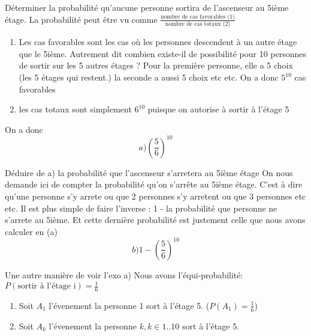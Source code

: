 	\begin{exo}
		\begin{subexo} {Déterminer la probabilité qu’aucune personne sortira de l’ascenseur au 5ième étage.}
			La probabilité peut être vu comme $\frac{\text{nombre de cas favorables (1)}}{\text{nombre de cas totaux (2)}}$
			
				\begin{enumerate}[label=(\arabic*)]
					\item Les cas favorables sont les cas où les personnes descendent à un autre étage que le 5ième.
					Autrement dit combien existe-il de possibilité pour 10 personnes de sortir sur les 5 autres étages ?
					Pour la première personne, elle a 5 choix (les 5 étages qui restent.) la seconde a aussi 5 choix etc etc.
					On a donc $5^{10}$ cas favorables
					\item les cas totaux sont simplement $6^{10}$ puisque on autorise à sortir à l'étage 5
				\end{enumerate}
				On a donc $$a) \left(\frac{5}{6}\right)^{10}$$
			
		\end{subexo}
		\begin{subexo}{Déduire de a) la probabilité que l'ascenseur s'arretera au 5ième étage}
				On nous demande ici de compter la probabilité qu'on s'arrête au 5ième étage. C'est à dire qu'une personne s'y arrete ou que 2 personnes s'y arretent ou que 3 personnes etc etc.
			Il est plus simple de faire l'inverse : 1 - la probabilité que personne ne s'arrete au 5ième. Et cette dernière probabilité est justement celle que nous avons calculer en (a)
			$$b)1 - \left( \dfrac{5}{6} \right)^{10}$$
			\end{subexo}
		\begin{subexo}{Une autre manière de voir l'exo a)}
			Nous avons l'équi-probabilité: $ P({\text{sortir à l'étage i}}) = \frac{1}{6}$
			\begin{enumerate}
				\item 			Soit $A_1$ l'évenement la personne 1 sort à l'étage 5. ($P(A_1) = \frac{1}{6}$)
\item 			Soit $A_k$ l'évenement la personne $k, k\in 1..10$ sort à l'étage 5.


\end{enumerate}
\end{subexo}
\end{exo}
